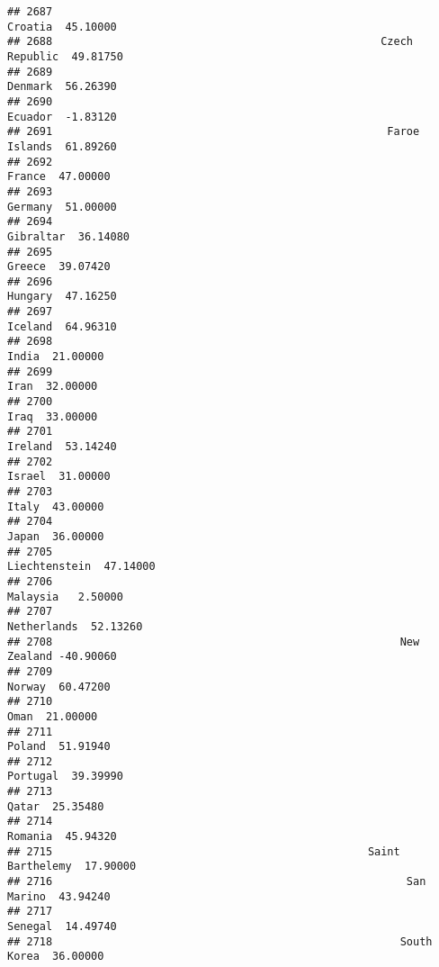 \documentclass[
]{article}
\begin{document}
\begin{verbatim}
## 2687                                                          Croatia  45.10000
## 2688                                                   Czech Republic  49.81750
## 2689                                                          Denmark  56.26390
## 2690                                                          Ecuador  -1.83120
## 2691                                                    Faroe Islands  61.89260
## 2692                                                           France  47.00000
## 2693                                                          Germany  51.00000
## 2694                                                        Gibraltar  36.14080
## 2695                                                           Greece  39.07420
## 2696                                                          Hungary  47.16250
## 2697                                                          Iceland  64.96310
## 2698                                                            India  21.00000
## 2699                                                             Iran  32.00000
## 2700                                                             Iraq  33.00000
## 2701                                                          Ireland  53.14240
## 2702                                                           Israel  31.00000
## 2703                                                            Italy  43.00000
## 2704                                                            Japan  36.00000
## 2705                                                    Liechtenstein  47.14000
## 2706                                                         Malaysia   2.50000
## 2707                                                      Netherlands  52.13260
## 2708                                                      New Zealand -40.90060
## 2709                                                           Norway  60.47200
## 2710                                                             Oman  21.00000
## 2711                                                           Poland  51.91940
## 2712                                                         Portugal  39.39990
## 2713                                                            Qatar  25.35480
## 2714                                                          Romania  45.94320
## 2715                                                 Saint Barthelemy  17.90000
## 2716                                                       San Marino  43.94240
## 2717                                                          Senegal  14.49740
## 2718                                                      South Korea  36.00000

\end{verbatim}
\end{document}
